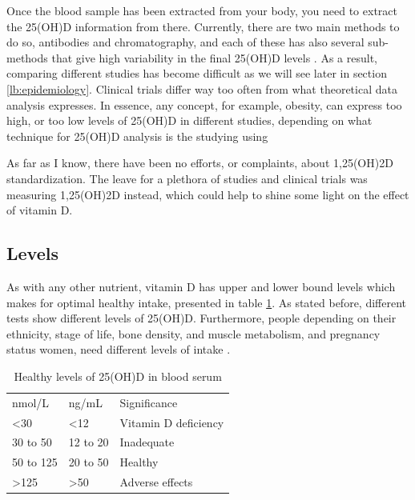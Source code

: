 Once the blood sample has been extracted from your body, you need to extract the 25(OH)D information from there. Currently, there are two main methods to do so, antibodies and chromatography, and each of these has also several sub-methods that give high variability in the final 25(OH)D levels \cite{ref:Wise2021}. As a result, comparing different studies has become difficult as we will see later in section \ref{lb:epidemiology}. Clinical trials differ way too often from what theoretical data analysis expresses. In essence, any concept, for example, obesity, can express too high, or too low levels of 25(OH)D in different studies, depending on what technique for 25(OH)D analysis is the studying using \cite{ref:Sempos2018, ref:LeFevre2015}

As far as I know, there have been no efforts, or complaints, about 1,25(OH)2D standardization. The leave for a plethora of studies and clinical trials was measuring 1,25(OH)2D instead, which could help to shine some light on the effect of vitamin D.

\subsection{Levels}

As with any other nutrient, vitamin D has upper and lower bound levels which makes for optimal healthy intake, presented in table \ref{tab:vitDLevels}. As stated before, different tests show different levels of 25(OH)D. Furthermore, people depending on their ethnicity, stage of life, bone density, and muscle metabolism, and pregnancy status women, need different levels of intake \cite{ref:Holick2011, ref:Holick2007, ref:Rosen2012, ref:Brown2018}.

\begin{table}[h!]
    \caption{Healthy levels of 25(OH)D in blood serum}
	\centering	
	\begin{tabular}{|l|l|l|} 
		\hline
		\rowcolor[rgb]{1,0.392,0.392} nmol/L & ng/mL    & Significance           \\ 
		\cline{1-2}
		<30          & <12       & Vitamin D deficiency  \\
		30 to 50     & 12 to 20  & Inadequate            \\
		50 to 125    & 20 to 50  & Healthy               \\
		>125         & >50       & Adverse effects       \\     
		\hline
	\end{tabular}
	\label{tab:vitDLevels}
\end{table}

